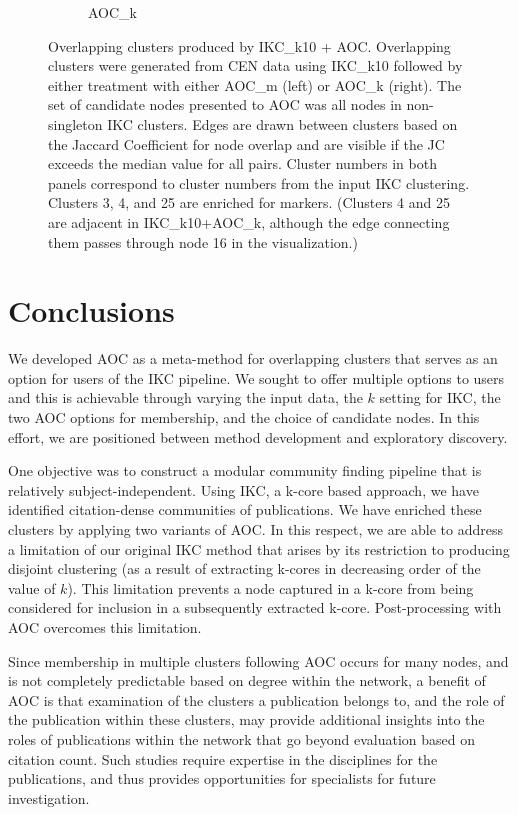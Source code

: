 \documentclass[12pt, oneside]{article}   	%
\begin{document}
\begin{figure}[H]
\begin{subfigure}[t]{0.48\textwidth}
\caption{AOC\_k}
\end{subfigure}
\caption{Overlapping clusters produced by IKC\_k10 + AOC.  Overlapping clusters were generated from CEN data using IKC\_k10 followed by either treatment with either AOC\_m (left) or AOC\_k (right). The set of candidate nodes presented to AOC was all nodes in non-singleton IKC clusters. Edges are drawn between clusters based on the Jaccard Coefficient for node overlap and are visible if the JC exceeds the median value for all pairs. Cluster numbers in both panels correspond to cluster numbers from the input IKC clustering. Clusters 3, 4, and 25 are enriched for markers.  (Clusters 4 and 25 are adjacent in IKC\_k10+AOC\_k, although the edge connecting them passes through node 16 in the visualization.)}
\label{fig:overlapping}
\end{figure}
		
\clearpage
	
\section{Conclusions} We developed AOC as a meta-method for overlapping clusters that serves as an option for users of the IKC pipeline. We sought to offer multiple options to users and this is achievable through varying the input data, the $k$ setting for IKC, the two AOC  options for membership, and the choice of candidate nodes. In this effort, we are positioned between method development and exploratory discovery. 

One objective was to construct a modular community finding pipeline that is relatively subject-independent. Using IKC, a k-core based approach, we have identified citation-dense communities of publications. We have enriched these clusters by applying two variants of AOC. In this respect, we are able to address a limitation of our original IKC method that arises by its restriction to producing disjoint clustering (as a result of extracting k-cores in decreasing order of the value of $k$). This limitation prevents a node captured in a k-core from being considered for inclusion in a subsequently extracted k-core. Post-processing with AOC overcomes this limitation.

Since membership in multiple clusters following AOC occurs for many nodes, and is not completely predictable based on degree within the network, a benefit of AOC is that examination of the clusters a publication belongs to, and the role of the publication within these clusters,  may provide additional insights into the roles of publications within the network that go beyond evaluation based on citation count.
Such studies require expertise in the disciplines for the publications, and thus provides opportunities for specialists for future investigation.
\end{document}
